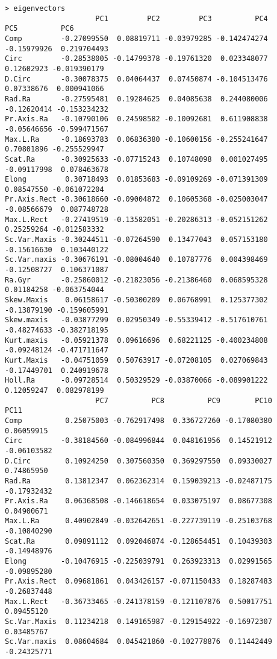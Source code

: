 \documentclass[11pt]{article}
\begin{document}
\begin{lstlisting}
> eigenvectors
                     PC1         PC2         PC3          PC4         PC5          PC6
Comp         -0.27099550  0.08819711 -0.03979285 -0.142474274 -0.15979926  0.219704493
Circ         -0.28538005 -0.14799378 -0.19761320  0.023348077  0.12602923 -0.019390179
D.Circ       -0.30078375  0.04064437  0.07450874 -0.104513476  0.07338676  0.000941066
Rad.Ra       -0.27595481  0.19284625  0.04085638  0.244080006 -0.12620414 -0.153234232
Pr.Axis.Ra   -0.10790106  0.24598582 -0.10092681  0.611908838 -0.05646656 -0.599471567
Max.L.Ra     -0.18693783  0.06836380 -0.10600156 -0.255241647  0.70801896 -0.255529947
Scat.Ra      -0.30925633 -0.07715243  0.10748098  0.001027495 -0.09117998  0.078463678
Elong         0.30718493  0.01853683 -0.09109269 -0.071391309  0.08547550 -0.061072204
Pr.Axis.Rect -0.30618660 -0.09004872  0.10605368 -0.025003047 -0.08566679  0.087748728
Max.L.Rect   -0.27419519 -0.13582051 -0.20286313 -0.052151262  0.25259264 -0.012583332
Sc.Var.Maxis -0.30244511 -0.07264590  0.13477043  0.057153180 -0.15616630  0.103440122
Sc.Var.maxis -0.30676191 -0.08004640  0.10787776  0.004398469 -0.12508727  0.106371087
Ra.Gyr       -0.25860012 -0.21823056 -0.21386460  0.068595328  0.01184258 -0.063754044
Skew.Maxis    0.06158617 -0.50300209  0.06768991  0.125377302 -0.13879190 -0.159605991
Skew.maxis   -0.03877299  0.02950349 -0.55339412 -0.517610761 -0.48274633 -0.382718195
Kurt.maxis   -0.05921378  0.09616696  0.68221125 -0.400234808 -0.09248124 -0.471711647
Kurt.Maxis   -0.04751059  0.50763917 -0.07208105  0.027069843 -0.17449701  0.240919678
Holl.Ra      -0.09728514  0.50329529 -0.03870066 -0.089901222  0.12059247  0.082978199
                     PC7          PC8          PC9        PC10        PC11
Comp          0.25075003 -0.762917498  0.336727260 -0.17080380  0.06059915
Circ         -0.38184560 -0.084996844  0.048161956  0.14521912 -0.06103582
D.Circ        0.10924250  0.307560350  0.369297550  0.09330027  0.74865950
Rad.Ra        0.13812347  0.062362314  0.159039213 -0.02487175 -0.17932432
Pr.Axis.Ra    0.06368508 -0.146618654  0.033075197  0.08677308  0.04900671
Max.L.Ra      0.40902849 -0.032642651 -0.227739119 -0.25103768 -0.10840290
Scat.Ra       0.09891112  0.092046874 -0.128654451  0.10439303 -0.14948976
Elong        -0.10476915 -0.225039791  0.263923313  0.02991565 -0.09895280
Pr.Axis.Rect  0.09681861  0.043426157 -0.071150433  0.18287483 -0.26837448
Max.L.Rect   -0.36733465 -0.241378159 -0.121107876  0.50017751  0.09455120
Sc.Var.Maxis  0.11234218  0.149165987 -0.129154922 -0.16972307  0.03485767
Sc.Var.maxis  0.08604684  0.045421860 -0.102778876  0.11442449 -0.24325771

\end{lstlisting}
\end{document}
